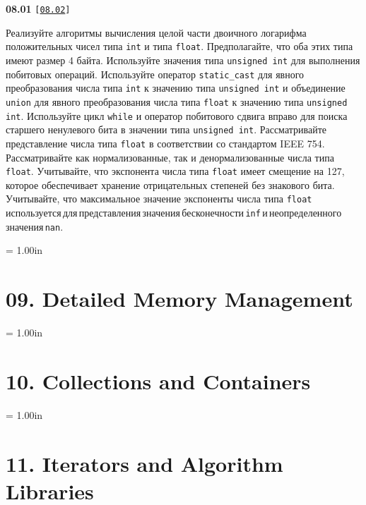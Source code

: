 \documentclass[a4paper,12pt]{article}
\begin{document}
{\large \textbf{08.01} \texttt{[\href{https://github.com/i-s-m-mipt/Education/blob/master/projects/examples/source/08.02.cpp}{\texttt{08.02}}]}}

\bigskip

Реализуйте алгоритмы вычисления целой части двоичного логарифма положительных чисел типа \lstinline{int} и типа \lstinline{float}. Предполагайте, что оба этих типа имеют размер 4 байта. Используйте значения типа \lstinline{unsigned int} для выполнения побитовых операций. Используйте оператор \lstinline{static_cast} для явного преобразования числа типа \lstinline{int} к значению типа \lstinline{unsigned int} и объединение \lstinline{union} для явного преобразования числа типа \lstinline{float} к значению типа \lstinline{unsigned int}. Используйте цикл \lstinline{while} и оператор побитового сдвига вправо для поиска старшего ненулевого бита в значении типа \lstinline{unsigned int}. Рассматривайте представление числа типа \lstinline{float} в соответствии со стандартом IEEE 754. Рассматривайте как нормализованные, так и денормализованные числа типа \lstinline{float}. Учитывайте, что экспонента числа типа \lstinline{float} имеет смещение на 127, которое обеспечивает хранение отрицательных степеней без знакового бита. Учитывайте, что максимальное значение экспоненты числа типа \lstinline{float}\,используется\,для\,представления\,значения\,бесконечности\,\lstinline{inf}\,и\,неопределенного\,значения\,\lstinline{nan}.

\bigskip



\newpage\thispagestyle{empty}\pdfpageheight = 1.00in\enlargethispage{100in}

\section{09. Detailed Memory Management}



\newpage\thispagestyle{empty}\pdfpageheight = 1.00in\enlargethispage{100in}

\section{10. Collections and Containers}



\newpage\thispagestyle{empty}\pdfpageheight = 1.00in\enlargethispage{100in}

\section{11. Iterators and Algorithm Libraries}
\end{document}
